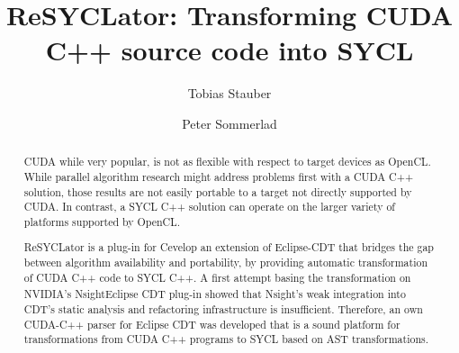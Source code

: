 \documentclass[sigconf]{acmart}
\newcommand{\nvidia}{NVIDIA\textsuperscript{\textregistered}}
\newcommand{\nsight}{Nsight\texttrademark{}}
\begin{document}
%
\title{ReSYCLator: Transforming CUDA C++ source code into SYCL}

%
\author{Tobias Stauber}
\author{Peter Sommerlad}

%

%
\begin{abstract}
CUDA\texttrademark{} while very popular, is not as flexible with respect to target devices as OpenCL\texttrademark{}. 
While parallel algorithm research might address problems first with a CUDA C++ solution, those results are not easily portable to a target not directly supported by CUDA. 
In contrast, a SYCL\texttrademark{} C++ solution can operate on the larger variety of platforms supported by OpenCL.

ReSYCLator is a plug-in for Cevelop\cite{cevelop} an extension of Eclipse-CDT that bridges the gap between algorithm availability and portability, by providing automatic transformation of CUDA C++ code to SYCL C++. A first attempt basing the transformation on \nvidia's \nsight Eclipse CDT plug-in showed that \nsight's weak integration into CDT's static analysis and refactoring infrastructure is insufficient. Therefore, an own CUDA-C++ parser for Eclipse CDT was developed that is a sound platform for transformations from CUDA C++ programs to SYCL based on AST transformations.
\end{abstract}
\end{document}
